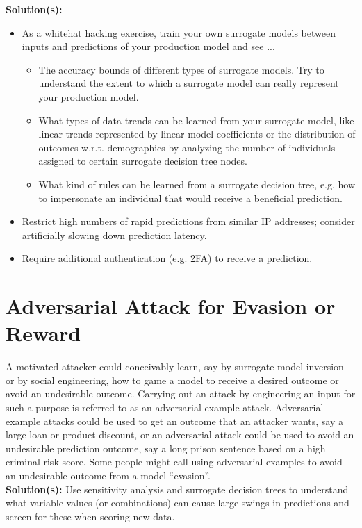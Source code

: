 \documentclass[fleqn]{article}
\begin{document}
\noindent\textbf{Solution(s):}
\begin{itemize}
\item As a whitehat hacking exercise, train your own surrogate models between inputs and predictions of your production model and see ...
	\begin{itemize}
	\item The accuracy bounds of different types of surrogate models. Try to understand the extent to which a surrogate model can really represent your production model. 
	\item What types of data trends can be learned from your surrogate model, like linear trends represented by linear model coefficients or the distribution of outcomes w.r.t. demographics by analyzing the number of individuals assigned to certain surrogate decision tree nodes.
	\item What kind of rules can be learned from a surrogate decision tree, e.g. how to impersonate an individual that would receive a beneficial prediction. 
	\end{itemize}
\item Restrict high numbers of rapid predictions from similar IP addresses; consider artificially slowing down prediction latency.
\item Require additional authentication (e.g. 2FA) to receive a prediction.
\end{itemize}

\section{Adversarial Attack for Evasion or Reward}
 
A motivated attacker could conceivably learn, say by surrogate model inversion or by social engineering, how to game a model to receive a desired outcome or avoid an undesirable outcome. Carrying out an attack by engineering an input for such a purpose is referred to as an adversarial example attack. Adversarial example attacks could be used to get an outcome that an attacker wants, say a large loan or product discount, or an adversarial attack could be used to avoid an undesirable prediction outcome, say a long prison sentence based on a high criminal risk score. Some people might call using adversarial examples to avoid an undesirable outcome from a model ``evasion''.\\

\noindent\textbf{Solution(s):} Use sensitivity analysis and surrogate decision trees to understand what variable values (or combinations) can cause large swings in predictions and screen for these when scoring new data.
\end{document}
